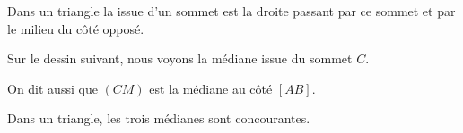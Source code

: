 

\begin{definition}
    Dans un triangle la  issue d'un sommet est la droite passant par ce sommet et par le milieu du côté opposé.
\end{definition}

Sur le dessin suivant, nous voyons la médiane issue du sommet \( C\).
\begin{center}
   
\end{center}
On dit aussi que \(  (CM) \) est la médiane  au côté \( [AB]\).

\begin{propriete}
    Dans un triangle, les trois médianes sont concourantes.
\end{propriete}

\begin{center}
\hfill

\end{center}
